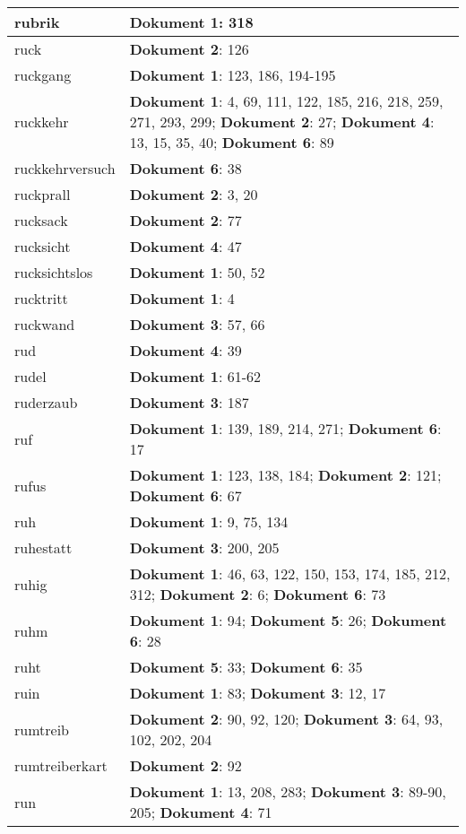 \documentclass[a5paper]{article}
\begin{document}
\begin{longtable}[l]{|l|p{3in}|}
\hline
rubrik & \textbf{Dokument 1}: 318 \\
\hline
ruck & \textbf{Dokument 2}: 126 \\
\hline
ruckgang & \textbf{Dokument 1}: 123, 186, 194-195 \\
\hline
ruckkehr & \textbf{Dokument 1}: 4, 69, 111, 122, 185, 216, 218, 259, 271, 293, 299; \textbf{Dokument 2}: 27; \textbf{Dokument 4}: 13, 15, 35, 40; \textbf{Dokument 6}: 89 \\
\hline
ruckkehrversuch & \textbf{Dokument 6}: 38 \\
\hline
ruckprall & \textbf{Dokument 2}: 3, 20 \\
\hline
rucksack & \textbf{Dokument 2}: 77 \\
\hline
rucksicht & \textbf{Dokument 4}: 47 \\
\hline
rucksichtslos & \textbf{Dokument 1}: 50, 52 \\
\hline
rucktritt & \textbf{Dokument 1}: 4 \\
\hline
ruckwand & \textbf{Dokument 3}: 57, 66 \\
\hline
rud & \textbf{Dokument 4}: 39 \\
\hline
rudel & \textbf{Dokument 1}: 61-62 \\
\hline
ruderzaub & \textbf{Dokument 3}: 187 \\
\hline
ruf & \textbf{Dokument 1}: 139, 189, 214, 271; \textbf{Dokument 6}: 17 \\
\hline
rufus & \textbf{Dokument 1}: 123, 138, 184; \textbf{Dokument 2}: 121; \textbf{Dokument 6}: 67 \\
\hline
ruh & \textbf{Dokument 1}: 9, 75, 134 \\
\hline
ruhestatt & \textbf{Dokument 3}: 200, 205 \\
\hline
ruhig & \textbf{Dokument 1}: 46, 63, 122, 150, 153, 174, 185, 212, 312; \textbf{Dokument 2}: 6; \textbf{Dokument 6}: 73 \\
\hline
ruhm & \textbf{Dokument 1}: 94; \textbf{Dokument 5}: 26; \textbf{Dokument 6}: 28 \\
\hline
ruht & \textbf{Dokument 5}: 33; \textbf{Dokument 6}: 35 \\
\hline
ruin & \textbf{Dokument 1}: 83; \textbf{Dokument 3}: 12, 17 \\
\hline
rumtreib & \textbf{Dokument 2}: 90, 92, 120; \textbf{Dokument 3}: 64, 93, 102, 202, 204 \\
\hline
rumtreiberkart & \textbf{Dokument 2}: 92 \\
\hline
run & \textbf{Dokument 1}: 13, 208, 283; \textbf{Dokument 3}: 89-90, 205; \textbf{Dokument 4}: 71 \\

\end{longtable}
\end{document}
